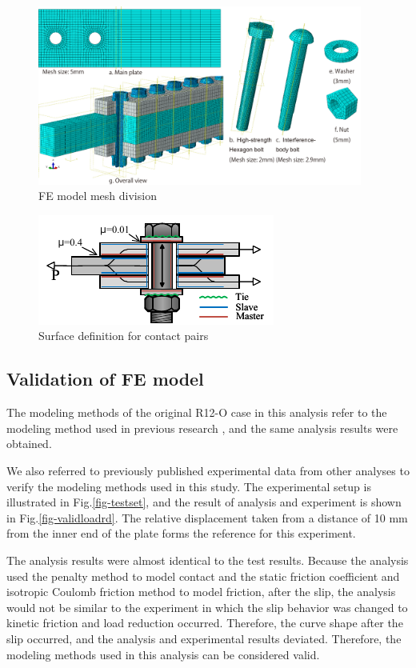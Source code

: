 \begin{figure}[htbp]
    \centering
    \includegraphics[width=0.95\textwidth]{imgs/ch5/femesh.pdf}
    \caption{FE model mesh division}
    \label{fig-femesh}
\end{figure}

\begin{figure}[htbp]
    \centering
    \includegraphics[width=0.5\linewidth]{imgs/ch5/contactp.pdf}
    \caption{Surface definition for contact pairs}
    \label{fig-contactp}
\end{figure}

\subsection{Validation of FE model}

The modeling methods of  the original R12-O case in this analysis refer to the modeling method used in previous research \cite{Peng2013}, and the same analysis results were obtained.

We also referred to previously published experimental data \cite{peng2010} from other analyses to verify the modeling methods used in this study. The experimental setup is illustrated in Fig.\ref{fig-testset}, and the result of analysis and experiment is shown in Fig.\ref{fig-validloadrd}. The relative displacement taken from a distance of 10 mm from the inner end of the plate forms the reference for this experiment.

The analysis results were almost identical to the test results. Because the analysis used the penalty method to model contact and the static friction coefficient and isotropic Coulomb friction method to model friction, after the slip, the analysis would not be similar to the experiment in which the slip behavior was changed to kinetic friction and load reduction occurred. Therefore, the curve shape after the slip occurred, and the analysis and experimental results deviated. Therefore, the modeling methods used in this analysis can be considered valid.

